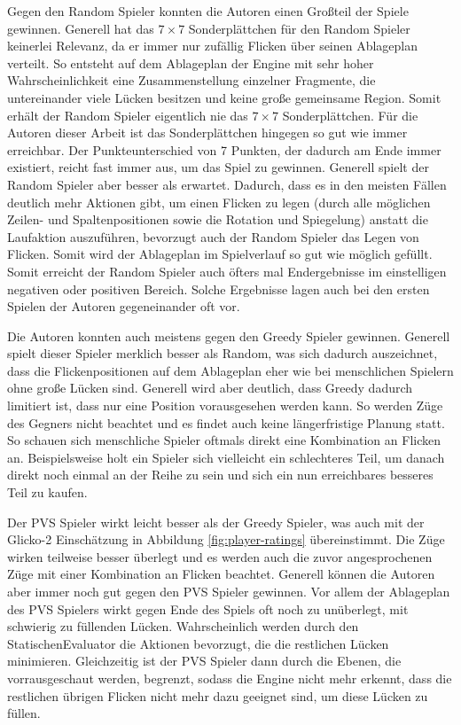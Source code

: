 Gegen den Random Spieler konnten die Autoren einen Großteil der Spiele gewinnen. Generell hat das $7\times 7$ Sonderplättchen für den Random Spieler keinerlei Relevanz, da er immer nur zufällig Flicken über seinen Ablageplan verteilt. So entsteht auf dem Ablageplan der Engine mit sehr hoher Wahrscheinlichkeit eine Zusammenstellung einzelner Fragmente, die untereinander viele Lücken besitzen und keine große gemeinsame Region. Somit erhält der Random Spieler eigentlich nie das $7\times 7$ Sonderplättchen. Für die Autoren dieser Arbeit ist das Sonderplättchen hingegen so gut wie immer erreichbar. Der Punkteunterschied von 7 Punkten, der dadurch am Ende immer existiert, reicht fast immer aus, um das Spiel zu gewinnen. Generell spielt der Random Spieler aber besser als erwartet. Dadurch, dass es in den meisten Fällen deutlich mehr Aktionen gibt, um einen Flicken zu legen (durch alle möglichen Zeilen- und Spaltenpositionen sowie die Rotation und Spiegelung) anstatt die Laufaktion auszuführen, bevorzugt auch der Random Spieler das Legen von Flicken. Somit wird der Ablageplan im Spielverlauf so gut wie möglich gefüllt. Somit erreicht der Random Spieler auch öfters mal Endergebnisse im einstelligen negativen oder positiven Bereich. Solche Ergebnisse lagen auch bei den ersten Spielen der Autoren gegeneinander oft vor.

Die Autoren konnten auch meistens gegen den Greedy Spieler gewinnen. Generell spielt dieser Spieler merklich besser als Random, was sich dadurch auszeichnet, dass die Flickenpositionen auf dem Ablageplan eher wie bei menschlichen Spielern ohne große Lücken sind. Generell wird aber deutlich, dass Greedy dadurch limitiert ist, dass nur eine Position vorausgesehen werden kann. So werden Züge des Gegners nicht beachtet und es findet auch keine längerfristige Planung statt. So schauen sich menschliche Spieler oftmals direkt eine Kombination an Flicken an. Beispielsweise holt ein Spieler sich vielleicht ein schlechteres Teil, um danach direkt noch einmal an der Reihe zu sein und sich ein nun erreichbares besseres Teil zu kaufen.

Der \ac{PVS} Spieler wirkt leicht besser als der Greedy Spieler, was auch mit der Glicko-2 Einschätzung in Abbildung \ref{fig:player-ratings} übereinstimmt. Die Züge wirken teilweise besser überlegt und es werden auch die zuvor angesprochenen Züge mit einer Kombination an Flicken beachtet. Generell können die Autoren aber immer noch gut gegen den \ac{PVS} Spieler gewinnen. Vor allem der Ablageplan des \ac{PVS} Spielers wirkt gegen Ende des Spiels oft noch zu unüberlegt, mit schwierig zu füllenden Lücken. Wahrscheinlich werden durch den StatischenEvaluator die Aktionen bevorzugt, die die restlichen Lücken minimieren. Gleichzeitig ist der \ac{PVS} Spieler dann durch die Ebenen, die vorrausgeschaut werden, begrenzt, sodass die Engine nicht mehr erkennt, dass die restlichen übrigen Flicken nicht mehr dazu geeignet sind, um diese Lücken zu füllen.

